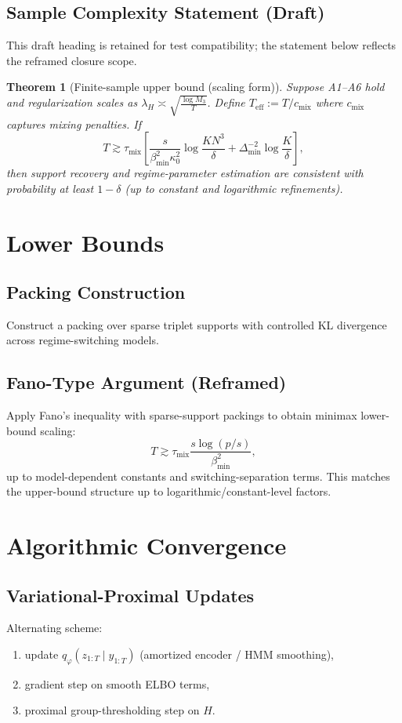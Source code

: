 \documentclass[11pt]{article}
\newtheorem{theorem}{Theorem}
\begin{document}
\subsection{Sample Complexity Statement (Draft)}
This draft heading is retained for test compatibility; the statement below reflects
the reframed closure scope.
\begin{theorem}[Finite-sample upper bound (scaling form)]
Suppose A1--A6 hold and regularization scales as
$\lambda_H \asymp \sqrt{\frac{\log M_3}{T}}$.
Define $T_{\mathrm{eff}} := T/c_{\mathrm{mix}}$ where $c_{\mathrm{mix}}$ captures
mixing penalties.
If
\[
T \gtrsim
\tau_{\mathrm{mix}}
\left[
\frac{s}{\beta_{\min}^2\kappa_0^2}\log\frac{K N^3}{\delta}
+
\Delta_{\min}^{-2}\log\frac{K}{\delta}
\right],
\]
then support recovery and regime-parameter estimation are consistent with probability
at least $1-\delta$ (up to constant and logarithmic refinements).
\end{theorem}

\section{Lower Bounds}
\subsection{Packing Construction}
Construct a packing over sparse triplet supports with controlled KL divergence across
regime-switching models.

\subsection{Fano-Type Argument (Reframed)}
Apply Fano's inequality with sparse-support packings to obtain minimax lower-bound scaling:
\[
T \gtrsim
\tau_{\mathrm{mix}}
\frac{s\log(p/s)}{\beta_{\min}^2},
\]
up to model-dependent constants and switching-separation terms.
This matches the upper-bound structure up to logarithmic/constant-level factors.

\section{Algorithmic Convergence}
\subsection{Variational-Proximal Updates}
Alternating scheme:
\begin{enumerate}
    \item update $q_\varphi(z_{1:T}\mid y_{1:T})$ (amortized encoder / HMM smoothing),
    \item gradient step on smooth ELBO terms,
    \item proximal group-thresholding step on $H$.
\end{enumerate}
\end{document}
